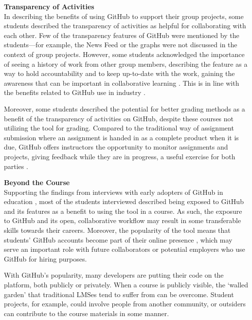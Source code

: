 \textbf{Transparency of Activities} \\
In describing the benefits of using GitHub to support their group projects, some students described the transparency of activities as helpful for collaborating with each other. Few of the transparency features of GitHub were mentioned by the students---for example, the News Feed or the graphs were not discussed in the context of group projects. However, some students acknowledged the importance of seeing a history of work from other group members, describing the feature as a way to hold accountability and to keep up-to-date with the work, gaining the awareness that can be important in collaborative learning \cite{janssen2013coordinated}. This is in line with the benefits related to GitHub use in industry \cite{dabbish2012social}.

Moreover, some students described the potential for better grading methods as a benefit of the transparency of activities on GitHub, despite these courses not utilizing the tool for grading. Compared to the traditional way of assignment submission where an assignment is handed in as a complete product when it is due, GitHub offers instructors the opportunity to monitor assignments and projects, giving feedback while they are in progress, a useful exercise for both parties \cite{glassy2006using}.

\textbf{Beyond the Course} \\
Supporting the findings from interviews with early adopters of GitHub in education \cite{zagalsky2015emergence}, most of the students interviewed described being exposed to GitHub and its features as a benefit to using the tool in a course. As such, the exposure to GitHub and its open, collaborative workflow may result in some transferable skills towards their careers. Moreover, the popularity of the tool means that students' GitHub accounts become part of their online presence \cite{marlow2013impression}, which may serve an important role with future collaborators or potential employers who use GitHub for hiring purposes.

With GitHub's popularity, many developers are putting their code on the platform, both publicly or privately. When a course is publicly visible, the `walled garden' that traditional LMSes tend to suffer from \cite{mott2010envisioning} can be overcome. Student projects, for example, could involve people from another community, or outsiders can contribute to the course materials in some manner. \\

